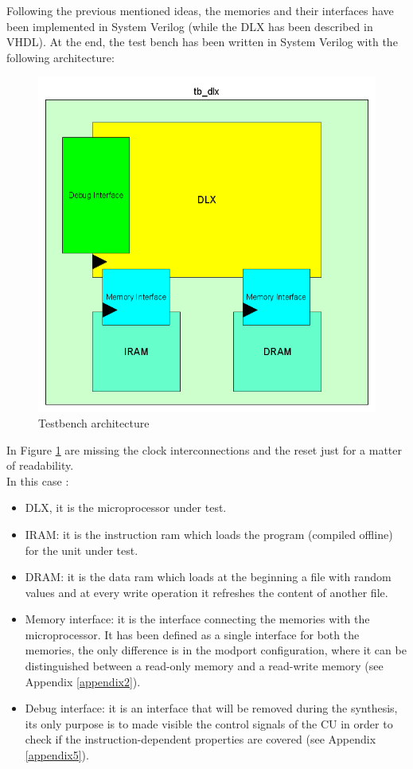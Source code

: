 Following the previous mentioned ideas, the memories and their interfaces have been implemented in System Verilog (while the DLX has been described in VHDL). At the end, the test bench has been written in System Verilog with the following architecture:
\begin{figure}[!htbp]
\centering
\captionsetup{justification=centering}
\includegraphics[scale=0.35,angle=0]{./chapters/figures/tb_dlx.png}
\caption{Testbench architecture}
\label{fig:tbdlx}
\end{figure}

In Figure \ref{fig:tbdlx} are missing the clock interconnections and the reset just for a matter of readability.\\ In this case :
\begin{itemize}
\item DLX, it is the microprocessor under test.
\item IRAM: it is the instruction ram which loads the program (compiled offline) for the unit under test.
\item DRAM: it is the data ram which loads at the beginning a file with random values and at every write operation it refreshes the content of another file.
\item Memory interface: it is the interface connecting the memories with the microprocessor. It has been defined as a single interface for both the memories, the only difference is in the modport configuration, where it can be distinguished between a read-only memory and a read-write memory (see Appendix \ref{appendix2}).
\item Debug interface: it is an interface that will be removed during the synthesis, its only purpose is to made visible the control signals of the CU in order to check if the instruction-dependent properties are covered (see Appendix \ref{appendix5}).
\end{itemize}

